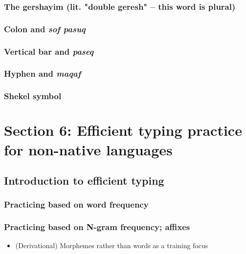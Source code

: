 \documentclass[11pt]{article}
\begin{document}
\subsubsection{The gershayim (lit. "double geresh" -- this word is plural)}
\label{sec:org1ea9948}

\subsubsection{Colon and \emph{sof pasuq}}
\label{sec:orgb404166}

\subsubsection{Vertical bar and \emph{paseq}}
\label{sec:org06be2f7}

\subsubsection{Hyphen and \emph{maqaf}}
\label{sec:orge99896b}

\subsubsection{Shekel symbol}
\label{sec:orgdf75564}

\section{Section 6: Efficient typing practice for non-native languages}
\label{sec:org5eaeab1}

\subsection{Introduction to efficient typing}
\label{sec:orgea6e295}

\subsubsection{Practicing based on word frequency}
\label{sec:org58e60b2}

\subsubsection{Practicing based on N-gram frequency; affixes}
\label{sec:orgb2839a8}

\begin{itemize}
\item (Derivational) Morphemes rather than words as a training focus
\end{itemize}
\end{document}
